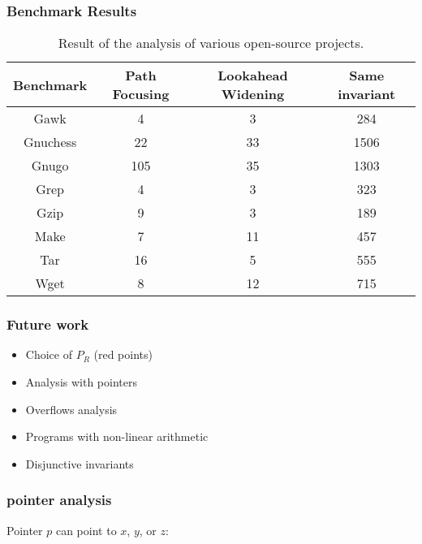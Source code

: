 \documentclass{beamer}
\begin{document}
\begin{frame}
\frametitle{Benchmark Results}

\begin{table}
\centering \small
\begin{tabular}{|c||c|c|c|} \hline 
Benchmark & Path Focusing & Lookahead Widening & Same invariant \\
\hline \hline
Gawk		& 4 & 3 & 284  \\ \hline
Gnuchess	& 22 & 33 & 1506  \\ \hline
Gnugo		& 105 & 35 & 1303  \\ \hline
Grep		& 4 & 3 & 323  \\ \hline
Gzip		& 9 & 3 & 189  \\ \hline
Make		&  7 & 11 & 457  \\ \hline
Tar			& 16 & 5 & 555  \\ \hline
Wget		& 8 & 12 & 715  \\ \hline
\end{tabular}
\caption{Result of the analysis of various open-source projects.}
\label{opensource}
\end{table}
\end{frame}

\begin{frame}
  \frametitle{Future work}
\begin{itemize}
\item Choice of $P_R$ (red points)
\item Analysis with pointers
\item Overflows analysis
\item Programs with non-linear arithmetic
\item Disjunctive invariants
\end{itemize}
\end{frame}

\begin{frame}
\frametitle{pointer analysis}
Pointer $p$ can point to $x$, $y$, or $z$: 
\begin{center}
\end{center}
\end{frame}
\end{document}
